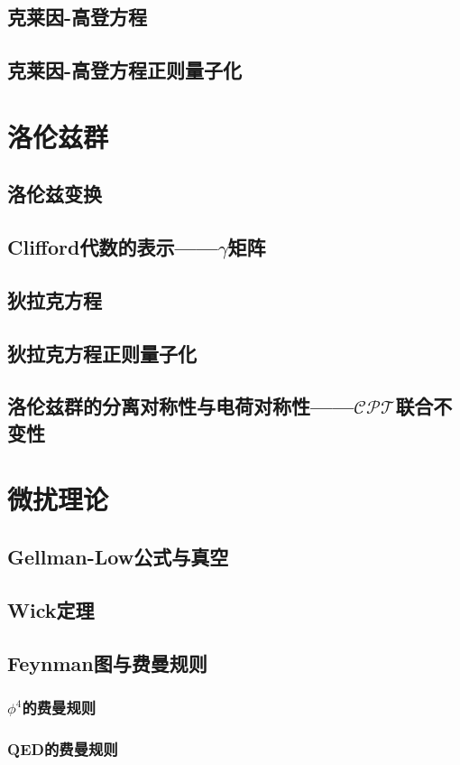\documentclass[a4paper,11pt]{article}
\theoremstyle{mystyle}
\begin{document}
\subsection{克莱因-高登方程}
\subsection{克莱因-高登方程正则量子化}
\section{洛伦兹群}
\subsection{洛伦兹变换}
\subsection{Clifford代数的表示——$\gamma$矩阵}
\subsection{狄拉克方程}
\subsection{狄拉克方程正则量子化}
\subsection{洛伦兹群的分离对称性与电荷对称性——$\mathcal{CPT}$联合不变性}
\section{微扰理论}
\subsection{Gellman-Low公式与真空}
\subsection{Wick定理}
\subsection{Feynman图与费曼规则}
\subsubsection{$\phi^4$的费曼规则}
\subsubsection{QED的费曼规则}
\end{document}
